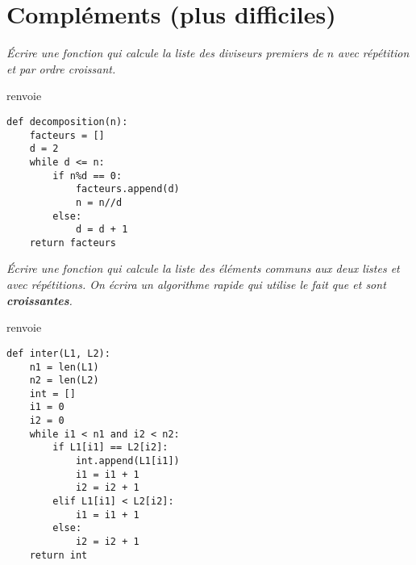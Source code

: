 \section{Compléments (plus difficiles)} 
\begin{Exercise}[title = Diviseurs]
\it Écrire une fonction  qui calcule la liste des diviseurs premiers de $n$ avec répétition et par ordre croissant.

 renvoie \type{[2, 2, 3, 3, 5]}
\end{Exercise}
\begin{Answer}
\begin{lstlisting}
def decomposition(n):
    facteurs = []
    d = 2
    while d <= n:
        if n%d == 0:
            facteurs.append(d)
            n = n//d 
        else:
            d = d + 1
    return facteurs
\end{lstlisting}
\end{Answer}
\begin{Exercise}[title = Intersection]
\it Écrire une fonction  qui calcule la liste des éléments communs aux deux listes  et  avec répétitions. On écrira un algorithme rapide qui utilise le fait que   et  sont {\bf croissantes}.

 renvoie \type{[2, 5, 5]}
\end{Exercise}
\begin{Answer}
\begin{lstlisting}
def inter(L1, L2):
    n1 = len(L1)
    n2 = len(L2)
    int = []
    i1 = 0
    i2 = 0
    while i1 < n1 and i2 < n2:
        if L1[i1] == L2[i2]:
            int.append(L1[i1])
            i1 = i1 + 1
            i2 = i2 + 1
        elif L1[i1] < L2[i2]:
            i1 = i1 + 1
        else:
            i2 = i2 + 1
    return int
\end{lstlisting}
\newpage
\end{Answer}
